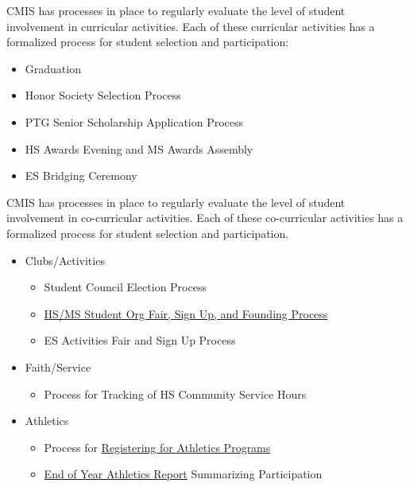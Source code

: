 \begin{findings}

CMIS has processes in place to regularly evaluate the level of student involvement in curricular activities.  Each of these curricular activities has a formalized process for student selection and participation:

\begin{itemize}
\item Graduation
\item Honor Society Selection Process
\item PTG Senior Scholarship Application Process
\item HS Awards Evening and MS Awards Assembly
\item ES Bridging Ceremony
\end{itemize}


CMIS has processes in place to regularly evaluate the level of student involvement in co-curricular activities.  Each of these co-curricular activities has a formalized process for student selection and participation.

\begin{itemize}
\item Clubs/Activities
\begin{itemize}
\item Student Council Election Process
\item \href{https://docs.google.com/document/d/10A10VbcdEcStSu9a4tbO-ZsZ38OyqRVfdQH9v1x6\_PI/edit?usp=sharing}{HS/MS Student Org Fair, Sign Up, and Founding Process}
\item ES Activities Fair and  Sign Up Process
\end{itemize}
\item Faith/Service
\begin{itemize}
\item Process for Tracking of HS Community Service Hours
\end{itemize}
\item Athletics
\begin{itemize}
\item Process for \href{http://blogs.cmis.ac.th/eagles/athletics/registration/}{Registering for Athletics Programs}
\item \href{http://blogs.cmis.ac.th/newsletter/2016/06/07/cmis-athletics-2015-2016-review-and-2016-2017-update/}{End of Year Athletics Report} Summarizing Participation
\end{itemize}
\end{itemize}


\end{findings}
